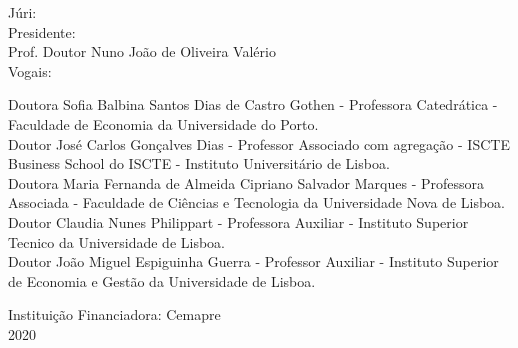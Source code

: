 \begin{titlepage}
\begin{center}
\noindent
\begin{flushleft} \footnotesize
Júri:\\[0.1cm]
Presidente:\\
Prof. Doutor Nuno João de Oliveira Valério\\[0.1cm]
Vogais:\\
\begin{adjustwidth}{0pt}{-50pt}
Doutora Sofia Balbina Santos Dias de Castro Gothen - Professora Catedrática - Faculdade de Economia da Universidade do Porto. \\
Doutor José Carlos Gonçalves Dias - Professor Associado com agregação - ISCTE Business School do ISCTE - Instituto Universitário de Lisboa.\\
Doutora Maria Fernanda de Almeida Cipriano Salvador Marques - Professora Associada - Faculdade de Ciências e Tecnologia da Universidade Nova de Lisboa.\\ 
Doutor Claudia Nunes Philippart - Professora Auxiliar - Instituto Superior Tecnico da Universidade de Lisboa.\\
Doutor João Miguel Espiguinha Guerra - Professor Auxiliar - Instituto Superior de Economia e Gestão da Universidade de Lisboa.
\end{adjustwidth} 
\end{flushleft}
\vspace{0.5em}

{Instituição Financiadora:  Cemapre}\\
\vspace{1.5em}
{\large 2020}\\[0.1cm]

\end{center}
\end{titlepage}